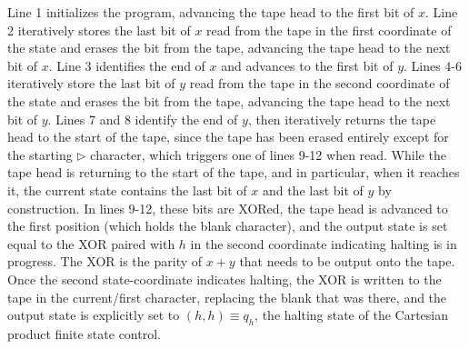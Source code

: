 Line 1 initializes the program, advancing the tape head to the first bit of $x$.  Line 2 iteratively stores the last bit of $x$ read from the tape in the first coordinate of the state and erases the bit from the tape, advancing the tape head to the next bit of $x$.  Line 3 identifies the end of $x$ and advances to the first bit of $y$.  Lines 4-6 iteratively store the last bit of $y$ read from the tape in the second coordinate of the state and erases the bit from the tape, advancing the tape head to the next bit of $y$.  Lines 7 and 8 identify the end of $y$, then iteratively returns the tape head to the start of the tape, since the tape has been erased entirely except for the starting $\triangleright$ character, which triggers one of lines 9-12 when read.  While the tape head is returning to the start of the tape, and in particular, when it reaches it, the current state contains the last bit of $x$ and the last bit of $y$ by construction.  In lines 9-12, these bits are XORed, the tape head is advanced to the first position (which holds the blank character), and the output state is set equal to the XOR paired with $h$ in the second coordinate indicating halting is in progress.  The XOR is the parity of $x+y$ that needs to be output onto the tape.  Once the second state-coordinate indicates halting, the XOR is written to the tape in the current/first character, replacing the blank that was there, and the output state is explicitly set to $(h, h)\equiv q_h$, the halting state of the Cartesian product finite state control. 

